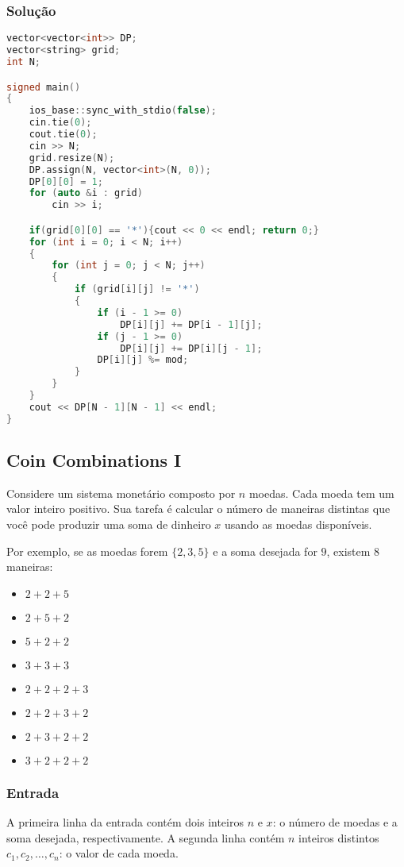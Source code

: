 \subsubsection*{Solução}
\begin{lstlisting}[language=C++]
vector<vector<int>> DP;
vector<string> grid;
int N;

signed main()
{
    ios_base::sync_with_stdio(false);
    cin.tie(0);
    cout.tie(0);
    cin >> N;
    grid.resize(N);
    DP.assign(N, vector<int>(N, 0));
    DP[0][0] = 1;
    for (auto &i : grid)
        cin >> i;

    if(grid[0][0] == '*'){cout << 0 << endl; return 0;}
    for (int i = 0; i < N; i++)
    {
        for (int j = 0; j < N; j++)
        {
            if (grid[i][j] != '*')
            {
                if (i - 1 >= 0)
                    DP[i][j] += DP[i - 1][j];
                if (j - 1 >= 0)
                    DP[i][j] += DP[i][j - 1];
                DP[i][j] %= mod;
            }
        }
    }
    cout << DP[N - 1][N - 1] << endl;
}
\end{lstlisting}

\subsection{Coin Combinations I}
Considere um sistema monetário composto por \( n \) moedas. Cada moeda tem um valor inteiro positivo. Sua tarefa é calcular o número de maneiras distintas que você pode produzir uma soma de dinheiro \( x \) usando as moedas disponíveis.

Por exemplo, se as moedas forem \(\{2,3,5\}\) e a soma desejada for \(9\), existem \(8\) maneiras:
\begin{itemize}
    \item \(2+2+5\)
    \item \(2+5+2\)
    \item \(5+2+2\)
    \item \(3+3+3\)
    \item \(2+2+2+3\)
    \item \(2+2+3+2\)
    \item \(2+3+2+2\)
    \item \(3+2+2+2\)
\end{itemize}

\subsubsection*{Entrada}
A primeira linha da entrada contém dois inteiros \( n \) e \( x \): o número de moedas e a soma desejada, respectivamente.  
A segunda linha contém \( n \) inteiros distintos \( c_1, c_2, \dots, c_n \): o valor de cada moeda.

